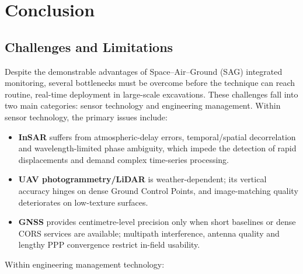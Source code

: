 \documentclass[preprint,11pt,authoryear,3p]{elsarticle}
\begin{document}
\section{Conclusion}

\subsection{Challenges and Limitations}\label{sec:challenges}

Despite the demonstrable advantages of Space--Air--Ground (SAG) integrated monitoring, several bottlenecks must be overcome before the technique can reach routine, real-time deployment in large-scale excavations. These challenges fall into two main categories: sensor technology and engineering management. Within sensor technology, the primary issues include:

\begin{itemize}
  \item \textbf{InSAR} suffers from atmospheric-delay errors, temporal/spatial decorrelation and wavelength-limited phase ambiguity, which impede the detection of rapid displacements and demand complex time-series processing.
  \item \textbf{UAV photogrammetry/LiDAR} is weather-dependent; its vertical accuracy hinges on dense Ground Control Points, and image-matching quality deteriorates on low-texture surfaces.
  \item \textbf{GNSS} provides centimetre-level precision only when short baselines or dense CORS services are available; multipath interference, antenna quality and lengthy PPP convergence restrict in-field usability.
\end{itemize}

Within engineering management technology:
\end{document}
